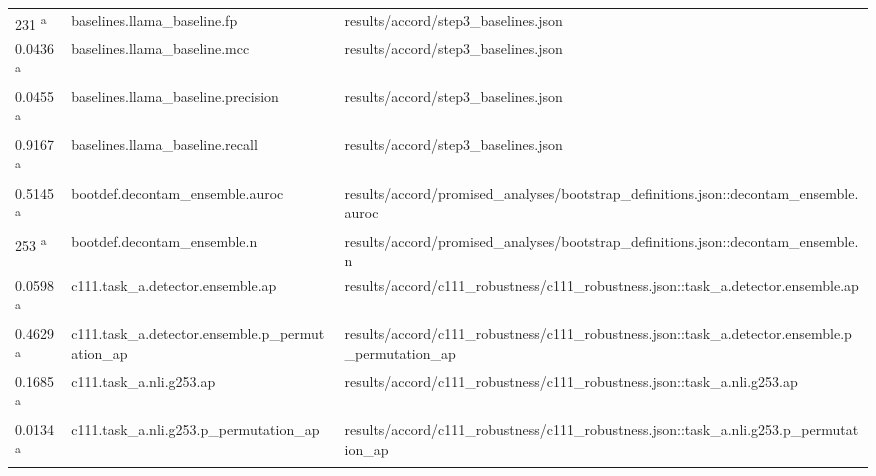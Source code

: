 \begin{longtable}{@{}p{0.7in}p{1.9in}p{2.6in}@{}}
231 \textsuperscript{a} & baselines.\allowbreak{}llama\_baseline.\allowbreak{}fp & results/\allowbreak{}accord/\allowbreak{}step3\_baselines.\allowbreak{}json\\
0.0436 \textsuperscript{a} & baselines.\allowbreak{}llama\_baseline.\allowbreak{}mcc & results/\allowbreak{}accord/\allowbreak{}step3\_baselines.\allowbreak{}json\\
0.0455 \textsuperscript{a} & baselines.\allowbreak{}llama\_baseline.\allowbreak{}precision & results/\allowbreak{}accord/\allowbreak{}step3\_baselines.\allowbreak{}json\\
0.9167 \textsuperscript{a} & baselines.\allowbreak{}llama\_baseline.\allowbreak{}recall & results/\allowbreak{}accord/\allowbreak{}step3\_baselines.\allowbreak{}json\\
0.5145 \textsuperscript{a} & bootdef.\allowbreak{}decontam\_ensemble.\allowbreak{}auroc & results/\allowbreak{}accord/\allowbreak{}promised\_analyses/\allowbreak{}bootstrap\_definitions.\allowbreak{}json::decontam\_ensemble.\allowbreak{}auroc\\
253 \textsuperscript{a} & bootdef.\allowbreak{}decontam\_ensemble.\allowbreak{}n & results/\allowbreak{}accord/\allowbreak{}promised\_analyses/\allowbreak{}bootstrap\_definitions.\allowbreak{}json::decontam\_ensemble.\allowbreak{}n\\
0.0598 \textsuperscript{a} & c111.\allowbreak{}task\_a.\allowbreak{}detector.\allowbreak{}ensemble.\allowbreak{}ap & results/\allowbreak{}accord/\allowbreak{}c111\_robustness/\allowbreak{}c111\_robustness.\allowbreak{}json::task\_a.\allowbreak{}detector.\allowbreak{}ensemble.\allowbreak{}ap\\
0.4629 \textsuperscript{a} & c111.\allowbreak{}task\_a.\allowbreak{}detector.\allowbreak{}ensemble.\allowbreak{}p\_permutation\_ap & results/\allowbreak{}accord/\allowbreak{}c111\_robustness/\allowbreak{}c111\_robustness.\allowbreak{}json::task\_a.\allowbreak{}detector.\allowbreak{}ensemble.\allowbreak{}p\_permutation\_ap\\
0.1685 \textsuperscript{a} & c111.\allowbreak{}task\_a.\allowbreak{}nli.\allowbreak{}g253.\allowbreak{}ap & results/\allowbreak{}accord/\allowbreak{}c111\_robustness/\allowbreak{}c111\_robustness.\allowbreak{}json::task\_a.\allowbreak{}nli.\allowbreak{}g253.\allowbreak{}ap\\
0.0134 \textsuperscript{a} & c111.\allowbreak{}task\_a.\allowbreak{}nli.\allowbreak{}g253.\allowbreak{}p\_permutation\_ap & results/\allowbreak{}accord/\allowbreak{}c111\_robustness/\allowbreak{}c111\_robustness.\allowbreak{}json::task\_a.\allowbreak{}nli.\allowbreak{}g253.\allowbreak{}p\_permutation\_ap\\

\end{longtable}
